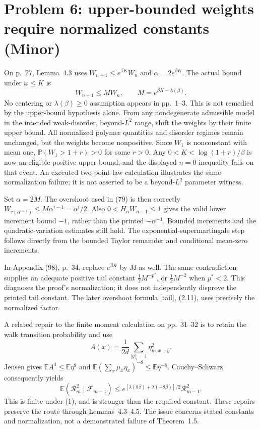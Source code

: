 \documentclass[10pt]{article}
\begin{document}
\section*{Problem 6: upper-bounded weights require normalized constants (Minor)}
On p. 27, Lemma 4.3 uses \(W_{n+1}\leq e^{\beta K}W_n\) and \(\alpha=2e^{\beta K}\). The actual bound under \(\omega\leq K\) is \[W_{n+1}\leq MW_n,\qquad M=e^{\beta K-\lambda(\beta)}.\] No centering or \(\lambda(\beta)\geq0\) assumption appears in pp. 1–3. This is not remedied by the upper-bound hypothesis alone. From any nondegenerate admissible model in the intended weak-disorder, beyond-\(L^2\) range, shift the weights by their finite upper bound. All normalized polymer quantities and disorder regimes remain unchanged, but the weights become nonpositive. Since \(W_1\) is nonconstant with mean one, \(\mathbb P(W_1>1+r)>0\) for some \(r>0\). Any \(0<K<\log(1+r)/\beta\) is now an eligible positive upper bound, and the displayed \(n=0\) inequality fails on that event. An executed two-point-law calculation illustrates the same normalization failure; it is not asserted to be a beyond-\(L^2\) parameter witness.\par
Set \(\alpha=2M\). The overshoot used in (79) is then correctly \(W_{\tau(\alpha^{i-1})}\leq M\alpha^{i-1}=\alpha^i/2\). Also \(0<H_nW_{n-1}\leq1\) gives the valid lower increment bound \(-1\), rather than the printed \(-\alpha^{-1}\). Bounded increments and the quadratic-variation estimates still hold. The exponential-supermartingale step follows directly from the bounded Taylor remainder and conditional mean-zero increments.\par
In Appendix (98), p. 34, replace \(e^{\beta K}\) by \(M\) as well. The same contradiction supplies an adequate positive tail constant \(\tfrac12M^{-p^*}\), or \(\tfrac12M^{-2}\) when \(p^*<2\). This diagnoses the proof’s normalization; it does not independently disprove the printed tail constant. The later overshoot formula [tail], (2.11), uses precisely the normalized factor.\par
A related repair to the finite moment calculation on pp. 31–32 is to retain the walk transition probability and use \[A(x)=\frac1{2d}\sum_{|y|_1=1}\eta_{m,x+y}^2 .\] Jensen gives \(\mathbb EA^4\leq\mathbb E\eta^8\) and \(\mathbb E(\sum_x\mu_x\eta_x)^{-8}\leq\mathbb E\eta^{-8}\). Cauchy–Schwarz consequently yields \[\mathbb E(\mathcal R_m^2\mid\mathcal F_{m-1})
 \leq e^{[\lambda(8\beta)+\lambda(-8\beta)]/2}\mathcal R_{m-1}^2.\] This is finite under (1), and is stronger than the required constant. These repairs preserve the route through Lemmas 4.3–4.5. The issue concerns stated constants and normalization, not a demonstrated failure of Theorem 1.5.\par
\end{document}
